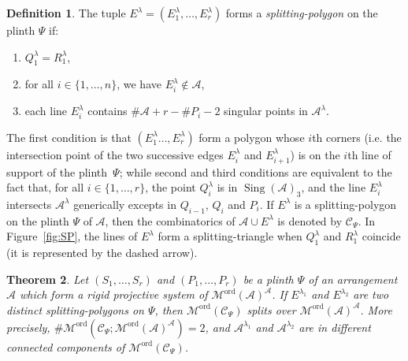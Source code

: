 \documentclass[11pt, a4paper]{amsart}
\newtheorem{theorem}{Theorem}[section]
\theoremstyle{definition}
\newtheorem{definition}[theorem]{Definition}
\theoremstyle{remark}
\newcommand{\A}{\mathcal{A}}
\newcommand{\C}{\mathcal{C}}
\newcommand{\M}{\mathcal{M}}
\newcommand{\ord}{\text{ord}}
\DeclareMathOperator{\sing}{Sing}
\begin{document}
\begin{definition}\label{def:SP}
	The tuple $E^\lambda=(E^\lambda_1,\dots,E^\lambda_r)$ forms a \emph{splitting-polygon} on the plinth $\Psi$ if:
	\begin{enumerate}
		\item $Q^\lambda_1 = R^\lambda_1$,
		\item for all $i\in\{1,\dots,n\}$, we have $E^\lambda_i \notin \A$,
		\item each line $E^\lambda_i$ contains $ \# \A + r - \# P_i - 2 $ singular points in $\A^\lambda$.
	\end{enumerate}
\end{definition}

The first condition is that $(E^\lambda_1\dots,E^\lambda_r)$ form a polygon whose $i$th corners (i.e. the intersection point of the two successive edges $E_i^\lambda$ and $E_{i+1}^\lambda$) is on the $i$th line of support of the plinth~$\Psi$; while second and third conditions are equivalent to the fact that, for all $i\in\{1,\dots,r\}$, the point $Q_i^\lambda$ is in $\sing(\A)_{3}$, and the line $E^\lambda_i$ intersects $\A^\lambda$ generically excepts in $Q_{i-1}$, $Q_i$ and $P_i$. If $E^\lambda$ is a splitting-polygon on the plinth $\Psi$ of $\A$, then the combinatorics of $\A\cup E^\lambda$ is denoted by $\C_\Psi$. In Figure~\ref{fig:SP}, the lines of $E^\lambda$ form a splitting-triangle when $Q_1^\lambda$ and $R_1^\lambda$ coincide (it is represented by the dashed arrow).

\begin{theorem}\label{thm:SP}
	Let $(S_1,\dots,S_r)$ and $(P_1,\dots,P_r)$ be a plinth $\Psi$ of an arrangement $\A$ which form a rigid projective system of  $\M^\ord(\A)^\A$. If $E^{\lambda_1}$ and $E^{\lambda_2}$ are two distinct splitting-polygons on $\Psi$, then $\M^\ord(\C_\Psi)$ splits over $\M^\ord(\A)^\A$. More precisely, $\# \M^\ord(\C_\Psi;\M^\ord(\A)^\A) = 2$, and $\A^{\lambda_1}$ and $\A^{\lambda_2}$ are in different connected components of $\M^\ord(\C_\Psi)$.
\end{theorem}
\end{document}
